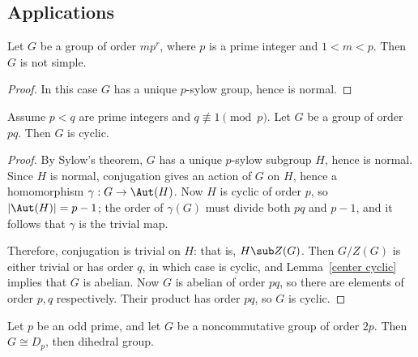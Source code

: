 \subsection{Applications}
\begin{proposition}
Let $G$ be a group of order $mp^r$, where $p$ is a prime integer and $1<m<p$. Then $G$ is not simple.
\end{proposition}
\begin{proof}
In this case $G$ has a unique $p$-sylow group, hence is normal.
\end{proof}
\begin{proposition}\label{group pq}
Assume $p<q$ are prime integers and $q\not\equiv 1 \pmod{p}$. Let $G$ be a group of order $pq$. Then $G$ is cyclic.
\end{proposition}
\begin{proof}
By Sylow's theorem, $G$ has a unique $p$-sylow subgroup $H$, hence is normal. Since $H$ is normal, conjugation gives an action of $G$ on $H$, hence a homomorphism $\gamma:G\to\Aut(H)$. Now $H$ is cyclic of order $p$, so $|\Aut(H)|=p-1$; the order of $\gamma(G)$ must divide both $pq$ and $p-1$, and it follows that $\gamma$ is the trivial map.\par
Therefore, conjugation is trivial on $H$: that is, $H\sub Z(G)$. Then $G/Z(G)$ is either trivial or has order $q$, in which case is cyclic, and Lemma~\ref{center cyclic} 
implies that $G$ is abelian. Now $G$ is abelian of order $pq$, so there are elements of order $p,q$ respectively. Their product has order $pq$, so $G$ is cyclic.
\end{proof}
\begin{proposition}
Let $p$ be an odd prime, and let $G$ be a noncommutative group of order $2p$. Then $G\cong D_{p}$, then dihedral group.
\end{proposition}
